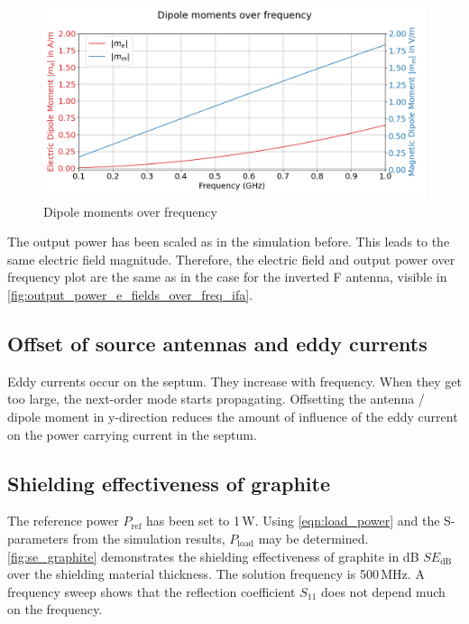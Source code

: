 \begin{figure}[h]
    \centering
    \includegraphics[width=1\linewidth]{Documentation//content//30_simulations//img/dipole_moment_cfm.png}
    \caption{Dipole moments over frequency}
    \label{fig:dipole_moment_cfm}
\end{figure}


The output power has been scaled as in the simulation before. This leads to the same electric field magnitude. Therefore, the electric field and output power over frequency plot are the same as in the case for the inverted F antenna, visible in \autoref{fig:output_power_e_fields_over_freq_ifa}.

\subsection{Offset of source antennas and eddy currents}

Eddy currents occur on the septum. They increase with frequency. When they get too large, the next-order mode starts propagating. Offsetting the antenna / dipole moment in y-direction reduces the amount of influence of the eddy current on the power carrying current in the septum. 


\subsection{Shielding effectiveness of graphite}

The reference power $P_\mathrm{ref}$ has been set to 1\,W. Using \autoref{eqn:load_power} and the S-parameters from the simulation results, $P_\mathrm{load}$ may be determined. \autoref{fig:se_graphite} demonstrates the shielding effectiveness of graphite in dB $SE_\mathrm{dB}$ over the shielding material thickness. The solution frequency is 500\,MHz. A frequency sweep shows that the reflection coefficient $S_{11}$ does not depend much on the frequency. 

